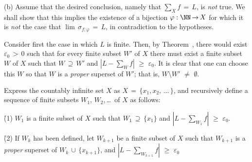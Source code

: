 \V

        (b) Assume that the desired conclusion, namely that $\sum_{X} f \,=\, L$, is {\em not} true.
    We shall show that this implies the existence of a bijection ${\varphi}:{\NN} \,{\rightarrow}\, X$
    for which it is {\em not} the case that $\lim\, {\sigma}_{f;{\varphi}} \,=\, L$, in contradiction to the hypotheses.

    Consider first the case in which $L$ is finite.
    Then, by Theorem~, there would exist ${\varepsilon}_{0}\,>\,0$ such that for every finite subset $W'$ of $X$
    there must exist a finite subset $W$ of $X$ such that $W \,{\supseteq}\, W'$ and $\left|L-\sum_{W} f\right|\,\,{\geq}\,\,{\varepsilon}_{0}$.
    It is clear that one can choose this $W$ so that $W$ is a {\em proper} superset of $W'$; that is, $W{\setminus}W' \,\,{\neq}\,\, {\emptyset}$.

        Express the countably infinite set $X$ as $X \,=\, \{x_{1},x_{2},\,{\ldots}\,\}$,
    and recursively define a sequence of finite subsets $W_{1}$, $W_{2}$,\,{\ldots}\, of $X$ as follows:

       \h (1) $W_{1}$ is a finite subset of $X$ such that $W_{1} \,{\supseteq}\, \{x_{1}\}$ and $\left|L-\sum_{W_{1}} f\right|\,\,{\geq}\,\,{\varepsilon}_{0}$.

       \h (2) If $W_{k}$ has been defined, let $W_{k+1}$ be a finite subset of $X$ such that $W_{k+1}$ is a {\em proper} superset of $W_{k}\,{\cup}\,\{x_{k+1}\}$, and $\left|L-\sum_{W_{k+1}} f\right|\,\,{\geq}\,\,{\varepsilon}_{0}$
    
